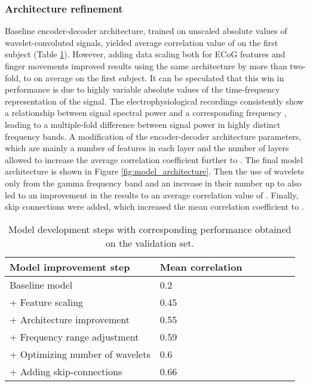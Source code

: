 \documentclass[letterpaper]{article} \usepackage{aaai22}  \usepackage{times}  \usepackage{helvet}  \usepackage{courier}  \usepackage[hyphens]{url}  \usepackage{graphicx} \urlstyle{rm} \def\UrlFont{\rm}  \usepackage{natbib}  \usepackage{caption} \DeclareCaptionStyle{ruled}{labelfont=normalfont,labelsep=colon,strut=off} \frenchspacing  \setlength{\pdfpagewidth}{8.5in}  \setlength{\pdfpageheight}{11in}  \usepackage{algorithm}
\begin{document}
\subsubsection{Architecture refinement}
Baseline encoder-decoder architecture, trained on unscaled absolute values of wavelet-convoluted signals, yielded average correlation value of  on the first subject (Table \ref{table:model_improvement}). However, adding data scaling both for ECoG features and finger movements improved results using the same architecture by more than two-fold, to  on average on the first subject. It can be speculated that this win in performance is due to highly variable absolute values of the time-frequency representation of the signal. The electrophysiological recordings consistently show a  relationship between signal spectral power and a corresponding frequency \citep{buzsaki2004}, leading to a multiple-fold difference between signal power in highly distinct frequency bands. A modification of the encoder-decoder architecture parameters, which are mainly a number of features in each layer and the number of layers allowed to increase the average correlation coefficient further to . The final model architecture is shown in Figure \ref{fig:model_architecture}. Then the use of wavelets only from the gamma frequency band and an increase in their number up to  also led to an improvement in the results to an average correlation value of . Finally, skip connections were added, which increased the mean correlation coefficient to . 

\begin{table}[!h]
  \caption{\label{table:model_improvement}
  Model development steps with corresponding performance obtained on the validation set.} 
  \label{table:model_improvement}
  \centering
  \begin{tabular}{lllllll}
    \toprule
    Model improvement step & Mean correlation  \\
\midrule
    Baseline model & 0.2 \\
    + Feature scaling &0.45 \\
    + Architecture improvement &0.55 \\
    + Frequency range adjustment &0.59 \\
    + Optimizing number of wavelets &0.6 \\
    + Adding skip-connections &0.66 \\
    \bottomrule
  \end{tabular}
\end{table}
\end{document}
